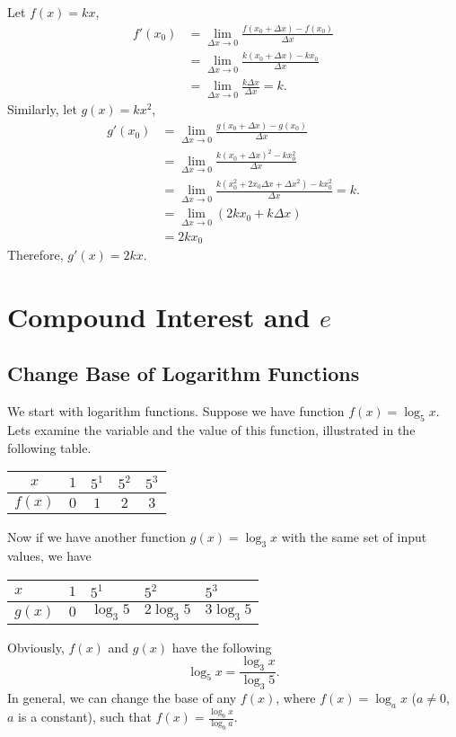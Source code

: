 \documentclass[11pt, oneside]{article}   	%
\begin{document}
Let $f(x)=kx$, 
\begin{align*}
f'(x_0) &=\lim_{\Delta x \rightarrow 0} \frac{f(x_0+\Delta x) - f(x_0)}{\Delta x}\\
&=\lim_{\Delta x \rightarrow 0} \frac{k(x_0+\Delta x) - kx_0}{\Delta x}\\
&=\lim_{\Delta x \rightarrow 0} \frac{k \Delta x}{\Delta x}=k.
\end{align*}
Similarly, let $g(x) = kx^2$,
\begin{align*}
g'(x_0) &=\lim_{\Delta x \rightarrow 0} \frac{g(x_0+\Delta x) - g(x_0)}{\Delta x}\\
&=\lim_{\Delta x \rightarrow 0} \frac{k(x_0+\Delta x)^2 - kx_0^2}{\Delta x}\\
&=\lim_{\Delta x \rightarrow 0} \frac{k(x_0^2+2x_0 \Delta x + \Delta x^2)-kx_0^2}{\Delta x}=k.\\
&=\lim_{\Delta x \rightarrow 0} (2k x_0+k \Delta x)\\
&=2kx_0
\end{align*}
Therefore, $g'(x)=2kx$.

\section{Compound Interest and $e$}
\subsection{Change Base of Logarithm Functions}
We start with logarithm functions. Suppose we have function $f(x)=\log_5x$. Lets examine the variable and the value of this function, illustrated in the following table.

\renewcommand{\arraystretch}{2}
\begin{center}
\begin{tabular}{|c|c|c|c|c|}
\hline
$x$ & $1$ & $5^1$ & $5^2$ & $5^3$\\
\hline
$f(x)$ & $0$ & $1$ & $2$ & $3$\\
\hline
\end{tabular}
\end{center}

Now if we have another function $g(x)=\log_3x$ with the same set of input values, we have

\renewcommand{\arraystretch}{2}
\begin{center}
\begin{tabular}{|>{\centering}p{1cm}|>{\centering}p{1cm}|>{\centering}p{1cm}|>{\centering}p{1cm}|>{\centering\arraybackslash}p{1cm}|}
\hline
$x$ & $1$ & $5^1$ & $5^2$ & $5^3$\\
\hline
$g(x)$ & $0$ & $\log_3 5$ & $2\log_3 5$ & $3 \log_3 5$\\
\hline
\end{tabular}
\end{center}
Obviously, $f(x)$ and $g(x)$ have the following
\[\log_5 x = \frac{\log_3 x}{\log_3 5} .\]
In general, we can change the base of any $f(x)$, where $f(x) = \log_a x$ ($a \ne 0$, $a$ is a constant), such that 
$f(x)=\frac{\log_b x}{\log_b a}$. 
\end{document}

